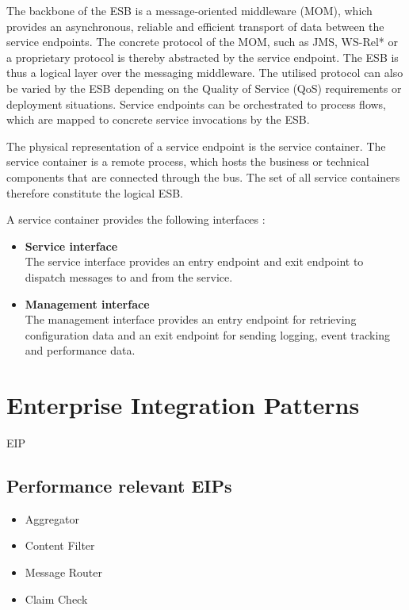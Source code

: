 The backbone of the ESB is a message-oriented middleware (MOM), which provides an asynchronous, reliable and efficient transport of data between the service endpoints. The concrete protocol of the MOM, such as JMS, WS-Rel* or a proprietary protocol is thereby abstracted by the service endpoint. The ESB is thus a logical layer over the messaging middleware. The utilised protocol can also be varied by the ESB depending on the Quality of Service (QoS) requirements or deployment situations. Service endpoints can be orchestrated to process flows, which are mapped to concrete service invocations by the ESB.

The physical representation of a service endpoint is the service container. The service container is a remote process, which hosts the business or technical components that are connected through the bus. The set of all service containers therefore constitute the logical ESB.

A service container provides the following interfaces \citep{Chappell:2004jo}:
\begin{itemize}
	\item \textbf{Service interface}\\
	The service interface provides an entry endpoint and exit endpoint to dispatch messages to and from the service.
	\item \textbf{Management interface}\\
	The management interface provides an entry endpoint for retrieving configuration data and an exit endpoint for sending logging, event tracking and performance data.
\end{itemize}

\section{Enterprise Integration Patterns}
\label{sec:ch03_eip}

\ac{EIP}

\subsection{Performance relevant \acp{EIP}}

\begin{itemize}
	\item Aggregator
	\item Content Filter
	\item Message Router
	\item Claim Check
\end{itemize}

